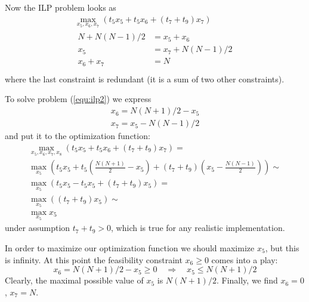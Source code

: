 \documentclass[12pt,a4paper,titlepage,oneside]{article}
\begin{document}
\begin{itemize}
Now the ILP problem looks as 
\begin{equation}
\begin{aligned}
	\max_{x_5, x_6, x_7} \left(t_5 x_5 + t_5 x_6 + (t_7+t_9)x_7 \right)\\
	\left.\begin{aligned}
		N + N(N-1)/2	&= x_5 + x_6\\
		x_5			&= x_7 + N(N-1)/2\\
		x_6 + x_7	&= N\\
	\end{aligned}\right.
\end{aligned}
\label{equ:ilp2}
\end{equation}
where the last constraint is redundant (it is a sum of two other constraints).

To solve problem (\ref{equ:ilp2}) we express
\begin{equation*}
	\left.\begin{aligned}
		x_6 = N(N+1)/2 - x_5\\
		x_7 = x_5 - N(N-1)/2
	\end{aligned}\right.
\end{equation*}
and put it to the optimization function:
\begin{equation*}
	\left.\begin{aligned}
		\max_{x_5, x_6, x_7, x_8} \left(t_5x_5 + t_5x_6 + (t_7+t_9)x_7\right) =\\
		\max_{x_5} \left(t_5x_5 + t_5\left(\frac{N(N+1)}2 - x_5\right) + (t_7+t_9)\left(x_5 - \frac{N(N-1)}2\right)\right) \sim\\
		\max_{x_5} \left(t_5x_5 - t_5x_5 + (t_7+t_9)x_5\right) =\\
		\max_{x_5} \left((t_7+t_9)x_5\right) \sim\\
		\max_{x_5} x_5
	\end{aligned}\right.
\end{equation*}
under assumption $t_7+t_9 > 0$, which is true for any realistic implementation.

In order to maximize our optimization function we should maximize $x_5$, but this is infinity.
At this point the feasibility constraint $x_6 \geq 0$ comes into a play:
\begin{equation*}
x_6 = N(N+1)/2 - x_5 \geq 0
\quad\Rightarrow\quad
x_5 \leq N(N+1)/2
\end{equation*}
Clearly, the maximal possible value of $x_5$ is $N(N+1)/2$.
Finally, we find $x_6 = 0$, $x_7 = N$.


\end{itemize}
\end{document}
